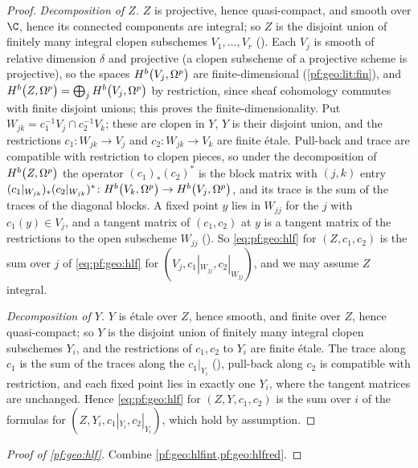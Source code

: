 \begin{proof}
\emph{Decomposition of $Z$.} $Z$ is projective, hence quasi-compact, and smooth over $\C$, hence its connected components are
integral; so $Z$ is the disjoint union of finitely many integral clopen subschemes $V_1,\dots,V_r$
(). Each $V_j$ is smooth of relative dimension $\delta$ and
projective (a clopen subscheme of a projective scheme is projective), so the spaces $\geoHdg{V_j}{p}{b}$ are finite-dimensional
(\cref{pf:geo:lit:fin}), and $\geoHdg{Z}{p}{b}=\bigoplus_j\geoHdg{V_j}{p}{b}$ by restriction, since sheaf cohomology commutes with finite
disjoint unions; this proves the finite-dimensionality. Put $W_{jk}=c_1^{-1}V_j\cap c_2^{-1}V_k$; these are clopen in $Y$, $Y$ is their
disjoint union, and the restrictions $c_1\colon W_{jk}\to V_j$ and $c_2\colon W_{jk}\to V_k$ are finite \'etale. Pull-back and trace are
compatible with restriction to clopen pieces, so under the decomposition of $\geoHdg{Z}{p}{b}$ the operator $(c_1)_*(c_2)^*$ is the block
matrix with $(j,k)$ entry $(c_1|_{W_{jk}})_*(c_2|_{W_{jk}})^*\colon\geoHdg{V_k}{p}{b}\to\geoHdg{V_j}{p}{b}$, and its trace is the sum of the
traces of the diagonal blocks. A fixed point $y$ lies in $W_{jj}$ for the $j$ with $c_1(y)\in V_j$, and a tangent matrix of $(c_1,c_2)$ at $y$
is a tangent matrix of the restrictions to the open subscheme $W_{jj}$ (). So
\eqref{eq:pf:geo:hlf} for $(Z,c_1,c_2)$ is the sum over $j$ of \eqref{eq:pf:geo:hlf} for $(V_j,c_1|_{W_{jj}},c_2|_{W_{jj}})$, and we may assume $Z$
integral.

\emph{Decomposition of $Y$.} $Y$ is \'etale over $Z$, hence smooth, and finite over $Z$, hence quasi-compact; so $Y$ is the disjoint union of
finitely many integral clopen subschemes $Y_i$, and the restrictions of $c_1,c_2$ to $Y_i$ are finite \'etale. The trace along $c_1$ is the sum
of the traces along the $c_1|_{Y_i}$ (), pull-back along $c_2$ is compatible with
restriction, and each fixed point lies in exactly one $Y_i$, where the tangent matrices are unchanged. Hence \eqref{eq:pf:geo:hlf} for
$(Z,Y,c_1,c_2)$ is the sum over $i$ of the formulas for $(Z,Y_i,c_1|_{Y_i},c_2|_{Y_i})$, which hold by assumption.
\end{proof}

\begin{proof}[Proof of \cref{pf:geo:hlf}]
Combine \cref{pf:geo:hlfint,pf:geo:hlfred}.
\end{proof}

